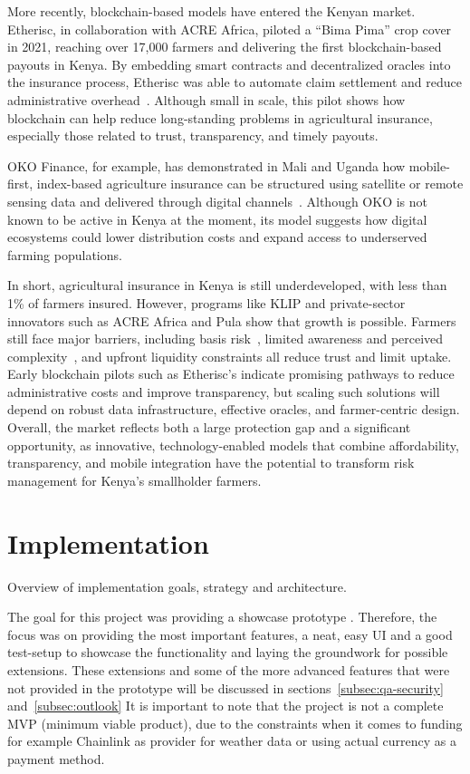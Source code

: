 \documentclass[11pt,a4paper]{article}
\begin{document}
    More recently, blockchain-based models have entered the Kenyan market.
    Etherisc, in collaboration with ACRE Africa, piloted a \enquote{Bima Pima} crop cover in 2021, reaching over 17,000 farmers and delivering the first blockchain-based payouts in Kenya.
    By embedding smart contracts and decentralized oracles into the insurance process, Etherisc was able to automate claim settlement and reduce administrative overhead~\parencite{Etherisc2021}.
    Although small in scale, this pilot shows how blockchain can help reduce long-standing problems in agricultural insurance, especially those related to trust, transparency, and timely payouts.

    OKO Finance, for example, has demonstrated in Mali and Uganda how mobile-first, index-based agriculture insurance can be structured using satellite or remote sensing data and delivered through digital channels~\parencite{ADA_OKOFinance2021}.
    Although OKO is not known to be active in Kenya at the moment, its model suggests how digital ecosystems could lower distribution costs and expand access to underserved farming populations.

    In short, agricultural insurance in Kenya is still underdeveloped, with less than 1\% of farmers insured.
    However, programs like KLIP and private-sector innovators such as ACRE Africa and Pula show that growth is possible.
    Farmers still face major barriers, including basis risk~\parencite{Jensen2016}, limited awareness and perceived complexity~\parencite{Janzen2020}, and upfront liquidity constraints all reduce trust and limit uptake.
    Early blockchain pilots such as Etherisc's indicate promising pathways to reduce administrative costs and improve transparency, but scaling such solutions will depend on robust data infrastructure, effective oracles, and farmer-centric design.
    Overall, the market reflects both a large protection gap and a significant opportunity, as innovative, technology-enabled models that combine affordability, transparency, and mobile integration have the potential to transform risk management for Kenya's smallholder farmers.


	\section{Implementation}\label{sec:implementation}
	Overview of implementation goals, strategy and architecture.

	The goal for this project was providing a showcase prototype .
	Therefore, the focus was on providing the most important features, a neat, easy UI and a good test-setup to showcase the functionality and laying the groundwork for possible extensions.
	These extensions and some of the more advanced features that were not provided in the prototype will be discussed in sections~\ref{subsec:qa-security} and~\ref{subsec:outlook}
	It is important to note that the project is not a complete MVP (minimum viable product), due to the constraints when it comes to funding for example Chainlink as provider for weather data or using actual currency as a payment method.
\end{document}
